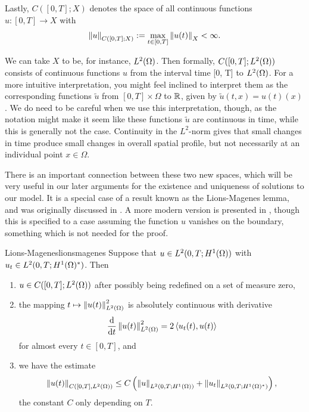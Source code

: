 Lastly, $C([0, T]; X)$ denotes the space of all continuous functions $u: [0, T] \to X$ with
%
\begin{equation*}
    \left\| u \right\|_{C([0, T]; X)} := \max_{t \in [0, T]} \left\| u(t) \right\|_X < \infty.
\end{equation*}

\noindent
We can take $X$ to be, for instance, $L^2(\Omega)$. Then formally, $C([0, T]; L^2(\Omega))$ consists of continuous functions $u$ from the interval time [0, T] to $L^2(\Omega)$. For a more intuitive interpretation, you might feel inclined to interpret them as the corresponding functions $\widetilde{u}$ from $[0, T] \times \Omega$ to $\mathbb{R}$, given by $\widetilde{u}(t, x) = u(t)(x)$. We do need to be careful when we use this interpretation, though, as the notation might make it seem like these functions $\widetilde{u}$ are continuous in time, while this is generally not the case. Continuity in the $L^2$-norm gives that small changes in time produce small changes in overall spatial profile, but not necessarily at an individual point $x \in \Omega$.

There is an important connection between these two new spaces, which will be very useful in our later arguments for the existence and uniqueness of solutions to our model. It is a special case of a result known as the Lions-Magenes lemma, and was originally discussed in \cite{lionsmagenes}. A more modern version is presented in \cite{evans2010partial}, though this is specified to a case assuming the function $u$ vanishes on the boundary, something which is not needed for the proof.

\begin{theorem}{Lions-Magenes}{lionsmagenes}
    Suppose that $u \in L^2(0, T; H^1(\Omega))$ with $u_t \in L^2(0, T; H^1(\Omega)^*)$. Then

    \begin{enumerate}[label=(\roman*)]
        \item $u \in C([0, T]; L^2(\Omega))$ after possibly being redefined on a set of measure zero,
        \item the mapping $t \mapsto \left\| u(t) \right\|_{L^2(\Omega)}^2$ is absolutely continuous with derivative \begin{equation*}
            \frac{\mathop{}\!\mathrm{d}}{\mathop{}\!\mathrm{d} t} \left\| u(t) \right\|_{L^2(\Omega)}^2 = 2 \left\langle u_t(t), u(t) \right\rangle
        \end{equation*}
        for almost every $t \in [0, T]$, and
        \item we have the estimate \begin{equation*}
            \left\| u(t) \right\|_{C([0, T], L^2(\Omega))} \leq C \left( \left\| u \right\|_{L^2(0, T; H^1(\Omega))} + \left\| u_t \right\|_{L^2(0, T; H^1(\Omega)^*)} \right) ,
        \end{equation*}
        the constant $C$ only depending on $T$.
    \end{enumerate}
\end{theorem}

